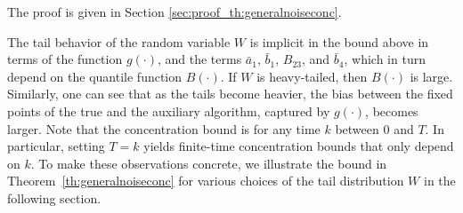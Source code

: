 \documentclass{article}
\newcommand{\lrp}[1]{\left( #1 \right)}
\newcommand{\lrs}[1]{\left[ #1 \right]}
\newcommand{\N}{\mathbb{N}}
\newtheorem{theorem}{Theorem}[section]
\begin{document}

The proof is given in Section \ref{sec:proof_th:generalnoiseconc}.


\medskip






The tail behavior of the random variable $W$ is implicit in the bound above in terms of the function $g(\cdot)$, and the terms $\bar{a}_1$, $\bar{b}_1$, $B_{23}$, and $\bar{b}_4$, which in turn depend on the quantile function $B(\cdot)$. %
If $W$ is heavy-tailed, then $B(\cdot)$ is large. Similarly, one can see that as the tails become heavier, the bias between the fixed points of the true and the auxiliary algorithm,  captured by $g(\cdot)$, becomes larger. Note that the concentration bound is for any time $k$ between $0$ and $T$. In particular, setting $T=k$ yields finite-time concentration bounds that only depend on $k$. To make these observations concrete, we illustrate the bound in Theorem~\ref{th:generalnoiseconc} for various choices of the tail distribution $W$ in the following section. 
\end{document}
